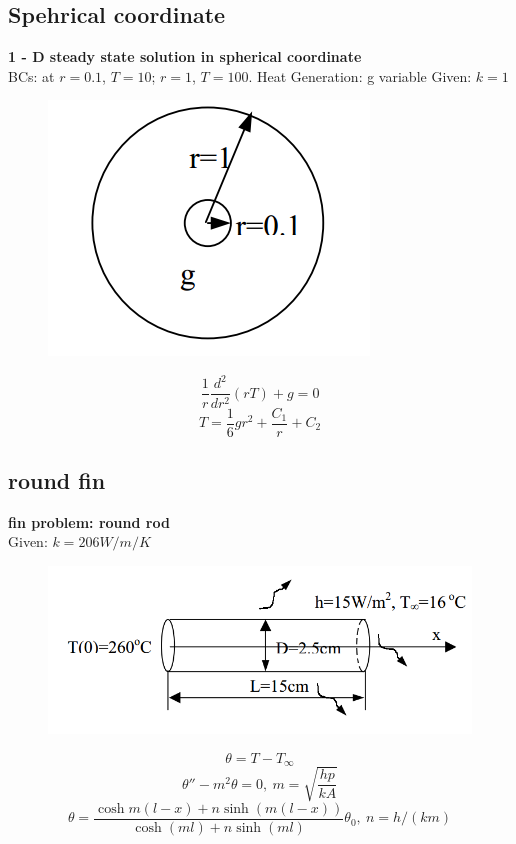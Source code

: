 \subsection{Spehrical coordinate}
\begin{example}
\textbf{1 - D steady state solution in spherical coordinate}\\
BCs: at $r = 0.1$, $T = 10$; $r = 1$, $T = 100$.
Heat Generation: g variable
Given: $k=1$
\begin{figure}[H]
  \centering
    \includegraphics[scale=0.5]{figures/appendixA/2}
\end{figure}
$$\frac{1}{r}\frac{d^2}{dr^2}(rT)+g=0$$
$$T=\frac{1}{6}gr^2+\frac{C_1}{r}+C_2$$
\end{example}

\subsection{round fin}
\begin{example}
\textbf{fin problem: round rod}\\
Given: $k=206W/m/K$
\begin{figure}[H]
  \centering
    \includegraphics[scale=0.5]{figures/appendixA/3}
\end{figure}
$$\theta=T-T_\infty$$
$$\theta''-m^2\theta=0,~m=\sqrt{\frac{hp}{kA}}$$
$$\theta=\frac{\cosh{m(l-x)}+n\sinh{(m(l-x))}}{\cosh{(ml)}+n\sinh{(ml)}}\theta_0,~n=h/(km)$$
\end{example}

